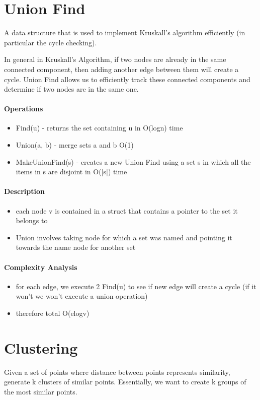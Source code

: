 \section{Union Find}
A data structure that is used to implement Kruskall's algorithm efficiently (in particular the cycle checking).

In general in Kruskall's Algorithm, if two nodes are already in the same connected component, then adding another edge between them will create a cycle. Union Find allows us to efficiently track these connected components and determine if two nodes are in the same one.

\paragraph{Operations}
\begin{itemize}
    \item Find(u) - returns the set containing u in O(logn) time
    \item Union(a, b) - merge sets a and b O(1)
    \item MakeUnionFind(s) - creates a new Union Find using a set s in which all the items in s are disjoint in O(|s|) time
\end{itemize}

\paragraph{Description}
\begin{itemize}
    \item each node v is contained in a struct that contains a pointer to the set it belongs to
    \item Union involves taking node for which a set was named and pointing it towards the name node for another set
\end{itemize}

\paragraph{Complexity Analysis}
\begin{itemize}
    \item for each edge, we execute 2 Find(u) to see if new edge will create a cycle (if it won't we won't execute a union operation)
    \item therefore total O(elogv)
\end{itemize}


\section{Clustering}
Given a set of points where distance between points represents similarity, generate k clusters of similar points. Essentially, we want to create k groups of the most similar points.

